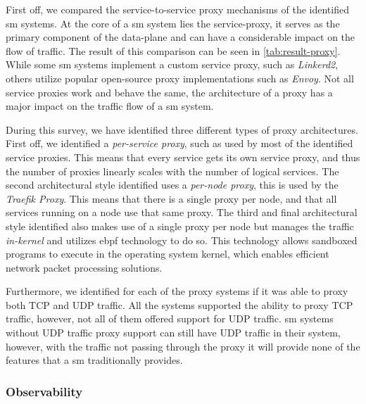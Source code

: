 First off, we compared the service-to-service proxy mechanisms of the identified \gls{sm} systems. At the core of a \gls{sm} system lies the service-proxy, it serves as the primary component of the data-plane and can have a considerable impact on the flow of traffic. The result of this comparison can be seen in \cref{tab:result-proxy}. While some \gls{sm} systems implement a custom service proxy, such as \textit{Linkerd2}, others utilize popular open-source proxy implementations such as \textit{Envoy}. Not all service proxies work and behave the same, the architecture of a proxy has a major impact on the traffic flow of a \gls{sm} system. 

During this survey, we have identified three different types of proxy architectures. First off, we identified a \textit{per-service proxy}, such as used by most of the identified service proxies. This means that every service gets its own service proxy, and thus the number of proxies linearly scales with the number of logical services. The second architectural style identified uses a \textit{per-node proxy}, this is used by the \textit{Traefik Proxy}. This means that there is a single proxy per node, and that all services running on a node use that same proxy. The third and final architectural style identified also makes use of a single proxy per node but manages the traffic \textit{in-kernel} and utilizes \gls{ebpf} technology to do so. This technology allows sandboxed programs to execute in the operating system kernel, which enables efficient network packet processing solutions. 

Furthermore, we identified for each of the proxy systems if it was able to proxy both TCP and UDP traffic. All the systems supported the ability to proxy TCP traffic, however, not all of them offered support for UDP traffic. \Gls{sm} systems without UDP traffic proxy support can still have UDP traffic in their system, however, with the traffic not passing through the proxy it will provide none of the features that a \gls{sm} traditionally provides.


\subsubsection{Observability}
\label{sec:survey:results:comparison:observability}

